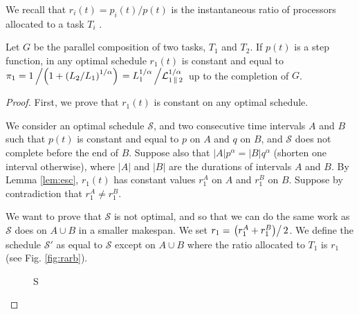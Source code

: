 \documentclass{llncs}
\newcommand{\LG}[1]{\mathcal{L}_{#1}}
\newcommand{\para}[2]{#1 \mathop{\parallel} #2}
\newcommand{\s}{\mathcal S\xspace}
\newcommand{\rat}{r}
\begin{document}
We recall that  $\rat_i(t)= p_i(t)/p(t)$ is the instantaneous ratio of
processors allocated to a task $T_i$ .

\begin{lemma}
\label{lem:rate}
Let $G$ be the parallel composition of two tasks, $T_1$ and $T_2$. If
$p(t)$ is a step function, in any optimal schedule $r_1(t)$ is
constant and equal to $\pi_1 =
{1}\left/\left({1+\left({L_2}/{L_1}\right)^
      {1/\alpha}}\right)\right. = L_1^{1/\alpha} \left/ \LG{\para
    12}^{1/\alpha} \right.$ up to the completion of $G$.
\end{lemma}


\begin{proof}
First, we prove that $r_1(t)$ is constant on any optimal
schedule.

We consider an optimal schedule $\s$, and two consecutive time intervals $A$ and
$B$ such that $p(t)$ is constant and equal to $p$ on $A$ and $q$ on $B$, and
$\s$ does not complete before the end of $B$. Suppose also that $|A|p^\alpha =
|B|q^\alpha$ (shorten one interval otherwise), where $|A|$ and
$|B|$ are the durations of intervals $A$ and $B$. By Lemma \ref{lem:esc}, 
$r_1(t)$ has constant values $r_1^A$ on $A$ and $r_1^B$ on
$B$. Suppose by contradiction that $r_1^A \neq r_1^B$.

We want to prove that $\s$ is not optimal, and so that we can do the
same work as $\s$ does on $A\cup B$ in a smaller makespan. We
set $r_1 = \left.\left({r_1^A+r_1^B}\right) \right/{2}$.  We define
the schedule $\s'$ as equal to $\s$ except on $A \cup B$ where the ratio
allocated to $T_1$ is $r_1$ (see Fig. \ref{fig:rarb}).
\begin{figure}[tb]
\centering
\ifdefined\s
\else
\newcommand{\s}{S}
\fi

\newcommand{\ya}{30pt}
\newcommand{\yb}{50pt}

\newcommand{\yf}{.5*\ya+.5*\yb}

\newcommand{\topy}{70pt}
\newcommand{\topx}{100pt}
\newcommand{\midx}{60pt}

\newcommand{\midlx}{50pt}

\newcommand{\scalerat}{0.8}
\end{figure}
\end{proof}
\end{document}
